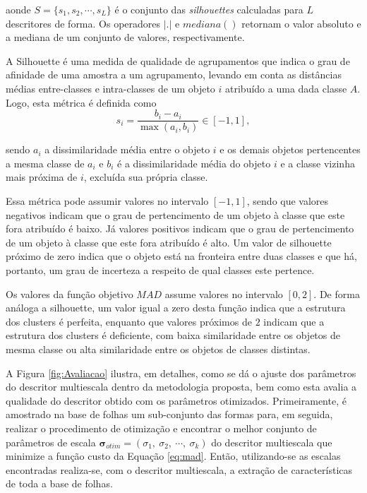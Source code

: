\noindent aonde $S = \{s_1,s_2,\cdots,s_L\}$ é o conjunto das \emph{silhouettes} calculadas para $L$ descritores de forma. Os operadores $|.|$  e {$mediana ( )$} retornam o valor absoluto e a mediana de um conjunto de valores, respectivamente.

A Silhouette \cite{Rousseeuw:1987} é uma medida de qualidade de agrupamentos que indica o grau de afinidade de uma amostra  a um agrupamento, levando em conta as distâncias médias entre-classes e intra-classes de um objeto $i$ atribuído a uma dada classe $A$. Logo, esta métrica é definida como 
\begin{equation}
s_i = \frac{b_i - a_i}{\max{(a_i,b_i)}} \in [-1,1],
\end{equation}

\noindent sendo $a_i$ a dissimilaridade média entre o objeto $i$ e os demais objetos pertencentes a mesma classe de $a_i$ e $b_i$ é a dissimilaridade média do objeto $i$ e a classe vizinha mais próxima de $i$, excluída sua própria classe. 

Essa métrica pode assumir valores no intervalo $[-1,1]$, sendo que valores negativos indicam que o grau de pertencimento de um objeto à classe que este fora atribuído é baixo. Já valores positivos indicam que o grau de pertencimento de um objeto à classe que este fora atribuído é alto. Um valor de silhouette próximo de zero indica que o objeto está na fronteira entre duas classes e que há, portanto, um grau de incerteza a respeito de qual classes este pertence.

Os valores da função objetivo $MAD$ assume valores no intervalo $[0,2]$. De forma análoga a silhouette, um valor igual a zero desta função indica que a estrutura dos clusters é perfeita, enquanto que valores próximos de $2$ indicam que a estrutura dos clusters é deficiente, com baixa similaridade entre os objetos de mesma classe ou alta similaridade entre os objetos de classes distintas.

A Figura  \ref{fig:Avaliacao} ilustra, em detalhes, como se dá o ajuste dos parâmetros do descritor multiescala dentro da metodologia proposta, bem como esta avalia a qualidade do descritor obtido com os parâmetros otimizados.  Primeiramente, é amostrado na base de folhas um sub-conjunto das formas para, em seguida, realizar o procedimento de otimização e encontrar o melhor conjunto de parâmetros de escala  $\boldsymbol{\sigma}_{otim} = (\sigma_1,\:\sigma_2,\:\cdots,\:\sigma_k)$ do descritor multiescala que minimize a função custo da Equação \ref{eq:mad}. Então, utilizando-se as escalas encontradas realiza-se, com o descritor multiescala, a extração de características de toda a base de folhas.

